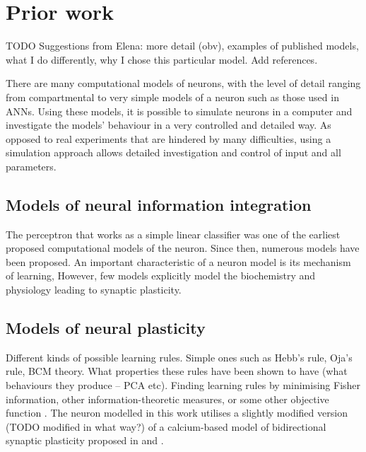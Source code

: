 \documentclass[a4paper,12pt]{report}
\theoremstyle{definition}
\begin{document}
\section{Prior work}
TODO Suggestions from Elena: more detail (obv), examples of published models, what I do differently, why I chose this particular model. Add references.


There are many computational models of neurons, with the level of detail ranging from compartmental to very simple models of a neuron such as those used in ANNs. Using these models, it is possible to simulate neurons in a computer and investigate the models' behaviour in a very controlled and detailed way. As opposed to real experiments that are hindered by many difficulties, using a simulation approach allows detailed investigation and control of input and all parameters.


\subsection{Models of neural information integration}


The perceptron \cite{rosenblatt1958perceptron} that works as a simple linear classifier was one of the earliest proposed computational models of the neuron. Since then, numerous models have been proposed. An important characteristic of a neuron model is its mechanism of learning, However, few models explicitly model the biochemistry and physiology leading to synaptic plasticity.




\subsection{Models of neural plasticity}

Different kinds of possible learning rules. Simple ones such as Hebb's rule, Oja's rule, BCM theory. What properties these rules have been shown to have (what behaviours they produce -- PCA etc). Finding learning rules by minimising Fisher information, other information-theoretic measures, or some other objective function \cite{echeveste2014generating}.
The neuron modelled in this work utilises a slightly modified version (TODO modified in what way?) of a calcium-based model of bidirectional synaptic plasticity proposed in \cite{shouval2002unified} and \cite{yeung2004synaptic}.
\end{document}
